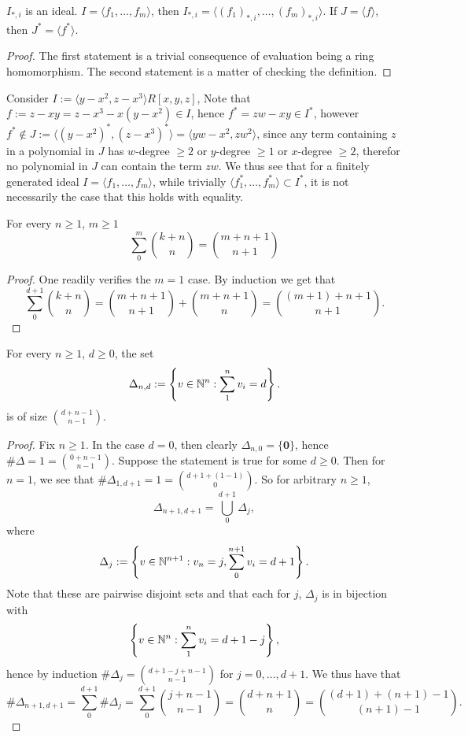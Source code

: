 \begin{lemma}
    $I_{\ast,i}$ is an ideal. $I=\langle f_1,\dots,f_m\rangle$, then $I_{\ast,i} = \langle (f_1)_{\ast,i},\dots, (f_m)_{\ast,i}\rangle$. If $J=\langle f\rangle$, then $J^\ast = \langle f^\ast\rangle$. 
\end{lemma}
\begin{proof}
    The first statement is a trivial consequence of evaluation being a ring homomorphism. The second statement is a matter of checking the definition.
\end{proof}
\begin{example}\label{HomogenizationPathology}
    Consider $I:=\langle y-x^2,z-x^3\rangle R[x,y,z]$, Note that $f:=z-xy=z-x^3-x(y-x^2)\in I$, hence $f^\ast = zw-xy \in I^\ast$, however $f^\ast \notin J:= \langle (y-x^2)^\ast,(z-x^3)^\ast\rangle =\langle yw-x^2,zw^2\rangle$, since any term containing $z$ in a polynomial in $J$ has $w$-degree $\geq 2$ or $y$-degree $\geq 1$ or $x$-degree $\geq 2$, therefor no polynomial in $J$ can contain the term $zw$. We thus see that for a finitely generated ideal $I=\langle f_1,\dots,f_m\rangle$, while trivially $\langle f_1^\ast,\dots,f_m^\ast \rangle \subset I^\ast$, it is not necessarily the case that this holds with equality.
\end{example}
\begin{lemma}\label{SimpleBinomialLemma}
    For every $n\geq 1$, $m\geq 1$
    $$\sum_0^m {k +n \choose n} = {m+n+1\choose n+1}$$
\end{lemma}
\begin{proof}
    One readily verifies the $m=1$ case. By induction we get that
    $$\sum_0^{d+1} {k+n\choose n} = {m+n+1\choose n+1}+ {m+n +1\choose n} = {(m+1)+n+1\choose n+1}.$$
\end{proof}
\begin{lemma}\label{NumberOfWaysOfPickingNnumbsersSummingToD}
    For every $n\geq 1$, $d\geq 0$, the set  
    $$\Delta_{n,d}:=\left\{v\in \mathbb{N}^n : \sum_1^n v_i=d\right\}.$$
    is of size ${d+n-1\choose n-1}$.
\end{lemma}
\begin{proof}
    Fix $n\geq 1$. In the case $d=0$, then clearly $\Delta_{n,0} = \{\textbf{0}\}$, hence $\#\Delta =1={0+n-1\choose n-1}.$
    Suppose the statement is true for some $d\geq 0$. Then for $n=1$, we see that $\#\Delta_{1,d+1} = 1 = { d +1 +(1-1) \choose 0}$. So for arbitrary $n\geq 1$,
    $$\Delta_{n+1,d+1} =\bigcup_0^{d+1} \Delta_j,$$
    where 
    $$\Delta_j := \left\{ v\in \mathbb{N}^{n+1}: v_{n} = j, \sum_0^{n+1} v_i = d+1 \right\}.$$
    Note that these are pairwise disjoint sets and that each for $j$, $\Delta_j$ is in bijection with 
    $$\left\{ v\in \mathbb{N}^{n} : \sum_1^n v_i = d+1-j \right\},$$
    hence by induction $\#\Delta_j = {d+1-j+n-1 \choose n-1}$ for $j=0,\dots, d+1$. We thus have that 
    $$\#\Delta_{n+1,d+1} = \sum_0^{d+1} \#\Delta_j = \sum_0^{d+1} {j+n-1 \choose n-1} = {d+n+1 \choose n} = {(d+1)+(n+1)-1\choose (n+1)-1}.$$
\end{proof}
